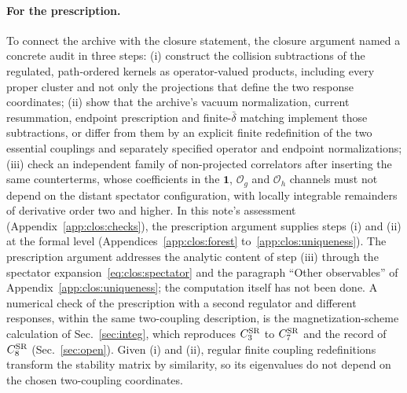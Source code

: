 \documentclass[11pt,a4paper]{article}
\numberwithin{equation}{section}
\newcommand{\CSR}{C^{\rm SR}}
\newcommand{\db}{\bar\delta}
\newcommand{\Og}{\mathcal O_g}
\newcommand{\Oh}{\mathcal O_h}
\begin{document}
\paragraph{For the prescription.} To connect the archive with the closure statement, the closure argument named a
concrete audit in three steps: (i) construct the collision subtractions of the regulated, path-ordered kernels as
operator-valued products, including every proper cluster and not only the projections that define the two response
coordinates; (ii) show that the archive's vacuum normalization, current resummation, endpoint prescription and
finite-$\db$ matching implement those subtractions, or differ from them by an explicit finite redefinition of the two
essential couplings and separately specified operator and endpoint normalizations; (iii) check an independent family of
non-projected correlators after inserting the same counterterms, whose coefficients in the $\mathbf 1$, $\Og$ and $\Oh$
channels must not depend on the distant spectator configuration, with locally integrable remainders of derivative order
two and higher. In this note's assessment (Appendix~\ref{app:clos:checks}), the prescription argument supplies steps
(i) and (ii) at the formal level
(Appendices~\ref{app:clos:forest} to~\ref{app:clos:uniqueness}). The prescription argument addresses the analytic content of step (iii)
through the spectator expansion~\eqref{eq:clos:spectator} and the paragraph ``Other observables'' of
Appendix~\ref{app:clos:uniqueness}; the computation itself has not been done. A numerical check of the prescription
with a second regulator and different responses, within the same two-coupling description, is the magnetization-scheme
calculation of Sec.~\ref{sec:integ}, which reproduces $\CSR_3$ to $\CSR_7$ and the record of $\CSR_8$ (Sec.~\ref{sec:open}). Given (i) and (ii), regular
finite coupling redefinitions transform the stability matrix by similarity, so its eigenvalues do not depend on the
chosen two-coupling coordinates.
\end{document}
